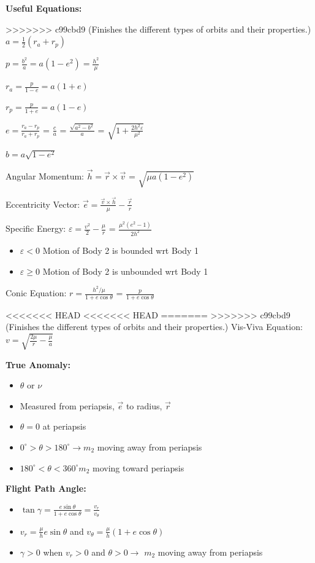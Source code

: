 \documentclass{article}
\begin{document}
\begin{multicols*}{3}
    \textbf{Useful Equations:}\par
>>>>>>> c99cbd9 (Finishes the different types of orbits and their properties.)
    $a = \frac{1}{2}(r_a+r_p)$\par 
    $p=\frac{b^2}{a}=a(1-e^2)=\frac{h^2}{\mu}$\par 
    $r_a = \frac{p}{1-e}=a(1+e)$\par 
    $r_p = \frac{p}{1+e}=a(1-e)$\par
    $e = \frac{r_a-r_p}{r_a+r_p}$ = $\frac{c}{a}$ = $\frac{\sqrt{a^2-b^2}}{a}$ = $\sqrt{1+\frac{2h^2\varepsilon}{\mu^2}}$\par 
    $b = a\sqrt{1-e^2}$ \par
    Angular Momentum: $\vec{h} = \vec{r} \times \vec{v}$ = $\sqrt{\mu a (1-e^2)}$ \par
    Eccentricity Vector: $\vec{e} = \frac{\vec{v} \times \vec{h}}{\mu}-\frac{\vec{r}}{r}$\par
    Specific Energy: $\varepsilon = \frac{v^2}{2}-\frac{\mu}{r}$ = $\frac{\mu^2(e^2-1)}{2h^2}$\par
    \begin{itemize}
        \itemsep0em
        \item $\varepsilon < 0$ Motion of Body 2 is bounded wrt Body 1
        \item $\varepsilon \ge 0$ Motion of Body 2 is unbounded wrt Body 1
    \end{itemize}
    Conic Equation: $r = \frac{h^2/\mu}{1+e\cos{\theta}}$ = $\frac{p}{1+e\cos{\theta}}$\par 
<<<<<<< HEAD
<<<<<<< HEAD
=======
>>>>>>> c99cbd9 (Finishes the different types of orbits and their properties.)
    Vis-Viva Equation: $v=\sqrt{\frac{2\mu}{r}-\frac{\mu}{a}}$\par
    \textbf{True Anomaly:} 
    \begin{itemize}
        \itemsep0em
        \item $\theta$ or $\nu$
        \item Measured from periapsis, $\vec{e}$ to radius, $\vec{r}$
        \item $\theta = 0$ at periapsis
        \item $0^\circ > \theta > 180^\circ \rightarrow m_2$ moving away from periapsis
        \item $180^\circ < \theta < 360^\circ m_2$ moving toward periapsis
    \end{itemize}
    \textbf{Flight Path Angle:} 
    \begin{itemize}
        \itemsep0em
        \item $\tan{\gamma} = \frac{e\sin{\theta}}{1+e\cos{\theta}} = \frac{v_r}{v_{\theta}}$
        \item $v_r = \frac{\mu}{h}e\sin{\theta}$ and $v_\theta = \frac{\mu}{h}(1+e\cos{\theta})$
        \item $\gamma > 0$ when $v_r>0$ and $\theta>0\rightarrow$ $m_2$ moving away from periapsis
    \end{itemize}
     

\end{multicols*}
\end{document}
